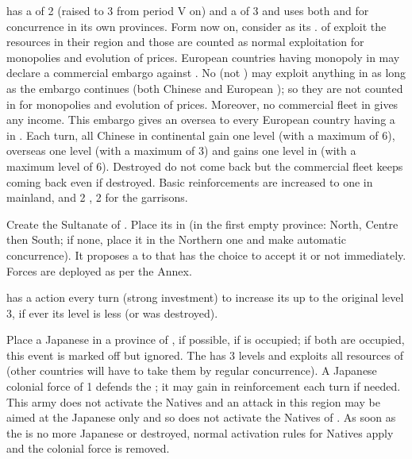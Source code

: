 \effetlong
\aparag \paysChine has a \FTI of 2 (raised to 3 from period V on) and a \DTI
of 3 and uses both \FTI and \DTI for concurrence in its own provinces. Form
now on, consider  as its \CTZ.
\aparag \TP of \paysChine exploit the resources in their region and those are
counted as normal exploitation for monopolies and evolution of prices.
\aparag European countries having monopoly in  may declare a
commercial embargo against \paysChine.  No \TP (not \COL) may exploit anything
in \paysChine as long as the embargo continues (both Chinese and European
\TP); so they are not counted in for monopolies and evolution of
prices. Moreover, no commercial fleet in  gives any income. This
embargo gives an oversea \CB to every European country having a \TP in
\paysChine.
\aparag Each turn, all Chinese \TP in continental \paysChine gain one level
(with a maximum of 6), overseas \TP one level (with a maximum of 3) and
\paysChine gains one \TradeFLEET level in  (with a maximum level
of 6). Destroyed \TP do not come back but the commercial fleet keeps coming
back even if destroyed.
\aparag Basic reinforcements are increased to one \ARMY\faceplus in mainland,
and 2 \LD, 2 \ND for the garrisons.





\phevnt
\aparag Create the Sultanate of \paysaceh. Place its \TP\facemoins in
\granderegionSumatra (in the first empty province: North, Centre then South;
if none, place it in the Northern one and make automatic concurrence).
\bparag It proposes a \dipAT to \TUR that has the choice to accept it or not
immediately.
\bparag Forces are deployed as per the Annex.

\effetlong
\aparag \paysaceh has a \TP action every turn (strong investment) to increase
its \TP up to the original level 3, if ever its level is less (or was
destroyed).





\phevnt
\aparag Place a Japanese \TP in a province of \granderegionCorea,
\provinceSeoul if possible, \provincePyongyang if \provinceSeoul is occupied;
if both are occupied, this event is marked off but ignored.
\aparag The \TP has 3 levels and exploits all resources of \granderegionCorea
(other countries will have to take them by regular concurrence).
\aparag A Japanese colonial force of 1 \ARMY\faceplus defends the \TP; it may
gain \ARMY\facemoins in reinforcement each turn if needed.  This army does not
activate the Natives and an attack in this region may be aimed at the Japanese
only and so does not activate the Natives of \granderegionCorea. As soon as
the \TP is no more Japanese or destroyed, normal activation rules for Natives
apply and the colonial force is removed.




